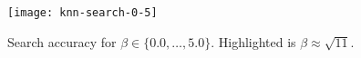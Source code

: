 \begin{figure}[h]
	\centering
	\texttt{[image: knn-search-0-5]}  %
	\caption[Search accuracy for $\beta \in \{ 0.0, \ldots, 5.0 \}$]{
		Search accuracy for $\beta \in \{ 0.0, \ldots, 5.0 \}$.
		Highlighted is $\beta \approx \sqrt{11}$.
	}\label{figure:knn-search-fine}
\end{figure}
